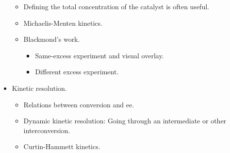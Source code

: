\documentclass[../notes.tex]{subfiles}
\begin{document}
\begin{itemize}
\begin{itemize}
        \item Defining the total concentration of the catalyst is often useful.
        \item Michaelis-Menten kinetics.
        \item Blackmond's work.
        \begin{itemize}
            \item Same-excess experiment and visual overlay.
            \item Different excess experiment.
        \end{itemize}
    \end{itemize}
    \item Kinetic resolution.
    \begin{itemize}
        \item Relations between conversion and ee.
        \item Dynamic kinetic resolution: Going through an intermediate or other interconversion.
        \item Curtin-Hammett kinetics.
    \end{itemize}
\end{itemize}
\end{document}
